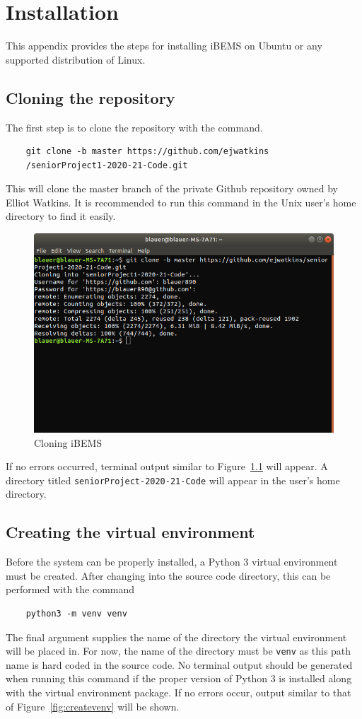 \chapter{Installation}
\label{ap: appendixA}

This appendix provides the steps for installing iBEMS on Ubuntu or any supported distribution of Linux.

\section{Cloning the repository}
The first step is to clone the repository with the command.
\begin{verbatim}
    git clone -b master https://github.com/ejwatkins
    /seniorProject1-2020-21-Code.git
\end{verbatim}
This will clone the master branch of the private Github repository owned by Elliot Watkins. It is recommended to run this command in the Unix user's home directory to find it easily.
\begin{figure}[H]
    \centering
    \includegraphics[scale=0.4]{figs/cloneiBEMS.png}
    \caption{Cloning iBEMS}
    \label{fig:cloneibems}
\end{figure}
If no errors occurred, terminal output similar to Figure~\ref{fig:cloneibems} will appear. A directory titled \texttt{seniorProject-2020-21-Code} will appear in the user's home directory.

\section{Creating the virtual environment}
Before the system can be properly installed, a Python 3 virtual environment must be created. After changing into the source code directory, this can be performed with the command
\begin{verbatim}
    python3 -m venv venv
\end{verbatim}
The final argument supplies the name of the directory the virtual environment will be placed in. For now, the name of the directory must be \texttt{venv} as this path name is hard coded in the source code. No terminal output should be generated when running this command if the proper version of Python 3 is installed along with the virtual environment package. If no errors occur, output similar to that of Figure~\ref{fig:createvenv} will be shown.

